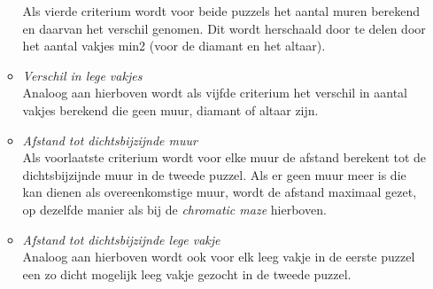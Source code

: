 \documentclass{article}
\begin{document}
\begin{itemize}
\begin{itemize}
Als vierde criterium wordt voor beide puzzels het aantal muren berekend en daarvan het verschil genomen. Dit wordt herschaald door te delen door het aantal vakjes min2 (voor de diamant en het altaar).
\item \textit{Verschil in lege vakjes}\\
Analoog aan hierboven wordt als vijfde criterium het verschil in aantal vakjes berekend die geen muur, diamant of altaar zijn.
\item \textit{Afstand tot dichtsbijzijnde muur}\\
Als voorlaatste criterium wordt voor elke muur de afstand berekent tot de dichtsbijzijnde muur in de tweede puzzel. Als er geen muur meer is die kan dienen als overeenkomstige muur, wordt de afstand maximaal gezet, op dezelfde manier als bij de \textit{chromatic maze} hierboven.
\item \textit{Afstand tot dichtsbijzijnde lege vakje}\\
Analoog aan hierboven wordt ook voor elk leeg vakje in de eerste puzzel een zo dicht mogelijk leeg vakje gezocht in de tweede puzzel.
\end{itemize}

\end{itemize}
\end{document}
